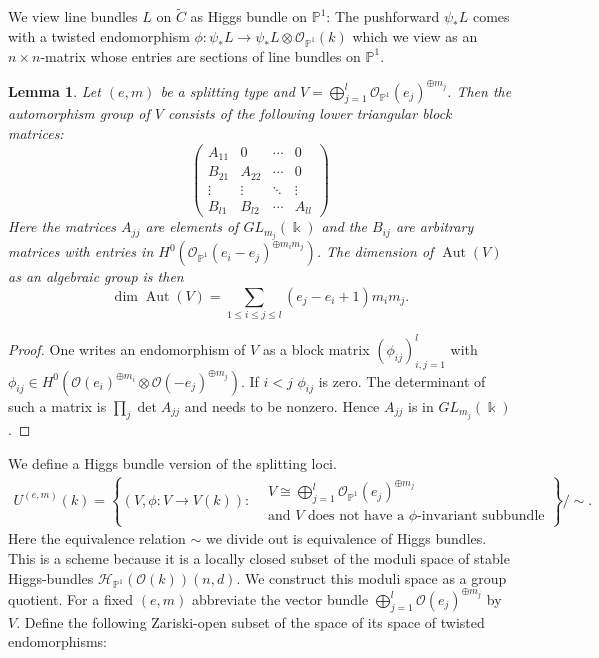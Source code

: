 \documentclass[12pt]{extarticle}
\newtheorem{lemma}[theorem]{Lemma}
\theoremstyle{definition}
\numberwithin{theorem}{section}
\newcommand{\PP}{\mathbb{P}}
\newcommand{\OO}{\mathcal{O}}
\newcommand{\cH}{\mathcal{H}}
\newcommand{\op}{\operatorname}
\renewcommand{\tilde}{\widetilde}		%
\begin{document}
We view line bundles $L$ on $\tilde{C}$ as Higgs bundle on $\PP^1$: The pushforward $\psi_*L$ comes with a twisted endomorphism $\phi: \psi_*L \rightarrow \psi_*L \otimes \OO_{\PP^1}(k)$ which we view as an $n\times n$-matrix whose entries are sections of line bundles on $\PP^1$. 
\begin{lemma}\label{lemma:aut_vectorbundle}
Let $(e,m)$ be a splitting type and $V=\bigoplus_{j=1}^l \OO_{\PP^1}(e_j)^{\oplus m_j}$. Then the automorphism group of $V$ consists of the following lower triangular block matrices:
\begin{equation*}
\begin{pmatrix}
A_{11} & 0 & \cdots & 0 \\
B_{21} & A_{22} & \cdots & 0 \\
\vdots & \vdots & \ddots &\vdots \\
B_{l1} & B_{l2} &\cdots& A_{ll}
\end{pmatrix}
\end{equation*}
Here the matrices $A_{jj}$ are elements of $GL_{m_j}(\Bbbk)$ and the $B_{ij}$ are arbitrary matrices with entries in $H^0(\OO_{\PP^1}(e_i - e_j)^{\oplus m_im_j})$. The dimension of $\op{Aut}(V)$ as an algebraic group is then
\begin{equation*}
\dim\op{Aut}(V) = \sum_{1\leq i \leq j \leq l}(e_j - e_i+1)m_im_j.
\end{equation*}
\end{lemma}
\begin{proof}
One writes an endomorphism of $V$ as a block matrix $\left(\phi_{ij}\right)_{i,j=1}^l$ with $\phi_{ij} \in H^0(\OO(e_i)^{\oplus m_i} \otimes \OO(-e_j)^{\oplus m_j})$. If $i < j$ $\phi_{ij}$ is zero. The determinant of such a matrix is $\prod_j \det A_{jj}$ and needs to be nonzero. Hence $A_{jj}$ is in $GL_{m_j}(\Bbbk)$. 
\end{proof} 
We define a Higgs bundle version of the splitting loci. 
\begin{align*}
U^{(e,m)}(k) =  \left\{ (V,\phi: V \rightarrow V(k)) : \begin{aligned}
&\text{$V\cong \bigoplus_{j=1}^l \OO_{\PP^1}(e_j)^{\oplus m_j}$}\\
&\text{and $V$ does not have a $\phi$-invariant subbundle}
\end{aligned} \right\} / \sim.
\end{align*}
Here the equivalence relation $\sim$ we divide out is equivalence of Higgs bundles. This is a scheme because it is a locally closed subset of the moduli space of stable Higgs-bundles $\cH_{\PP^1}(\OO(k))(n,d)$. We construct this moduli space as a group quotient. For a fixed $(e,m )$ abbreviate the vector bundle $\bigoplus_{j=1}^l \OO(e_j)^{\oplus m_j}$ by $V$. Define the following Zariski-open subset of the space of its space of twisted endomorphisms:
\end{document}
